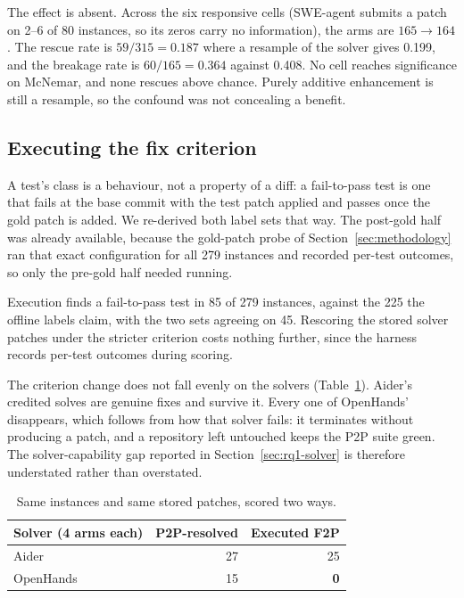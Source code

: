 \documentclass[journal]{IEEEtran}
\begin{document}
The effect is absent. Across the six responsive cells (SWE-agent submits a patch on 2--6 of 80 instances, so its zeros carry no information), the arms are $165 \rightarrow 164$. The rescue rate is $59/315 = 0.187$ where a resample of the solver gives 0.199, and the breakage rate is $60/165 = 0.364$ against 0.408. No cell reaches significance on McNemar, and none rescues above chance. Purely additive enhancement is still a resample, so the confound was not concealing a benefit.

\subsection{Executing the fix criterion}
\label{sec:executed}
A test's class is a behaviour, not a property of a diff: a fail-to-pass test is one that fails at the base commit with the test patch applied and passes once the gold patch is added. We re-derived both label sets that way. The post-gold half was already available, because the gold-patch probe of Section~\ref{sec:methodology} ran that exact configuration for all 279 instances and recorded per-test outcomes, so only the pre-gold half needed running.

Execution finds a fail-to-pass test in 85 of 279 instances, against the 225 the offline labels claim, with the two sets agreeing on 45. Rescoring the stored solver patches under the stricter criterion costs nothing further, since the harness records per-test outcomes during scoring.

The criterion change does not fall evenly on the solvers (Table~\ref{tab:strict}). Aider's credited solves are genuine fixes and survive it. Every one of OpenHands' disappears, which follows from how that solver fails: it terminates without producing a patch, and a repository left untouched keeps the P2P suite green. The solver-capability gap reported in Section~\ref{sec:rq1-solver} is therefore understated rather than overstated.

\begin{table}[t]
\centering
\caption{Same instances and same stored patches, scored two ways.}
\label{tab:strict}
\small
\begin{tabular}{lrr}
\toprule
Solver (4 arms each) & P2P-resolved & Executed F2P \\
\midrule
Aider     & 27 & 25 \\
OpenHands & 15 & \textbf{0} \\
\bottomrule
\end{tabular}
\end{table}
\end{document}
